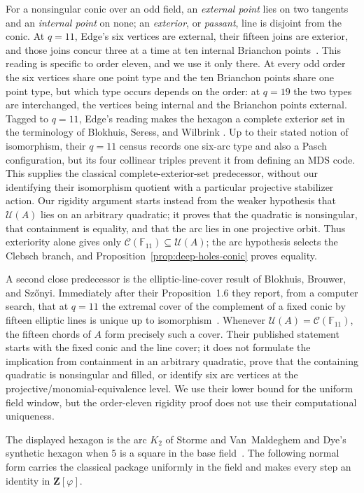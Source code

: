 \documentclass[11pt]{article}
\theoremstyle{definition}
\theoremstyle{remark}
\newcommand{\F}{\mathbb{F}}
\newcommand{\cC}{\mathcal{C}}
\newcommand{\cU}{\mathcal{U}}
\begin{document}
For a nonsingular conic over an odd field, an \emph{external point} lies on
two tangents and an \emph{internal point} on none; an \emph{exterior}, or
\emph{passant}, line is disjoint from the conic.
At $q=11$, Edge's six vertices are external, their fifteen joins are
exterior, and those joins concur three at a time at ten internal Brianchon
points~\cite[\S\S29--32]{Edge1956}. This reading is specific to order
eleven, and we use it only there. At every odd order the six vertices share
one point type and the ten Brianchon points share one point type, but which
type occurs depends on the order: at $q=19$ the two types are interchanged,
the vertices being internal and the Brianchon points external. Tagged to
$q=11$, Edge's reading makes the hexagon a complete exterior
set in the terminology of Blokhuis, Seress, and Wilbrink
\cite[pp.~143,146]{BSW1992}. Up to their stated notion of isomorphism, their
$q=11$ census records one six-arc type and also a Pasch
configuration, but its four collinear triples prevent it from defining an
MDS code. This supplies the classical complete-exterior-set predecessor,
without our identifying their isomorphism quotient with a particular
projective stabilizer action. Our rigidity argument starts instead from the
weaker hypothesis that $\cU(A)$ lies on an arbitrary quadratic; it proves
that the quadratic is nonsingular, that containment is equality, and that
the arc lies in one projective orbit. Thus exteriority alone gives only
$\cC(\F_{11})\subseteq\cU(A)$; the arc hypothesis selects the Clebsch
branch, and Proposition~\ref{prop:deep-holes-conic} proves equality.

A second close predecessor is the elliptic-line-cover result of Blokhuis,
Brouwer, and Sz\H{o}nyi. Immediately after their Proposition~1.6 they report,
from a computer search, that at $q=11$ the extremal cover of the complement
of a fixed conic by fifteen elliptic lines is unique up to
isomorphism~\cite[following Proposition~1.6]{BBS2010}. Whenever
$\cU(A)=\cC(\F_{11})$, the fifteen chords of $A$ form precisely such a
cover. Their published statement starts with the fixed conic and the line
cover; it does not formulate the implication from containment in an
arbitrary quadratic, prove that the containing quadratic is nonsingular and
filled, or identify six arc vertices at the projective/monomial-equivalence
level. We use their lower bound for the uniform field window, but the
order-eleven rigidity proof does not use their computational uniqueness.

The displayed hexagon is the arc $K_2$ of Storme and Van~Maldeghem
\cite[Props.~11--12]{SVM1995} and Dye's synthetic hexagon when $5$ is a
square in the base field~\cite[Theorem~1, pp.~275--276]{Dye1991}. The
following normal form carries the classical package uniformly in the field
and makes every step an identity in $\mathbf Z[\varphi]$.
\end{document}
